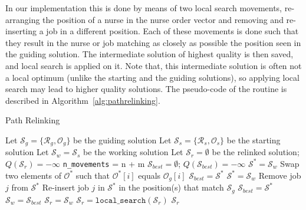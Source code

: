 \documentclass[a4paper,11pt,authoryear]{elsarticle}
\begin{document}
In our implementation this is done by means of two local search movements, re-arranging the position of a nurse in the nurse order vector and removing and re-inserting a job in a different position. Each of these movements is done such that they result in the nurse or job matching as closely as possible the position seen in the guiding solution. The intermediate solution of highest quality is then saved, and local search is applied on it. Note that, this intermediate solution is often not a local optimum (unlike the starting and the guiding solutions), so applying local search may lead to higher quality solutions. The pseudo-code of the routine is described in Algorithm~\ref{alg:pathrelinking}.

% 
\begin{algorithm}[h]
\caption{Path Relinking}
\label{alg:pathrelinking}
\begin{algorithmic}[1]
\State Let $\mathcal{S}_g = \{\mathcal{R}_g, \mathcal{O}_g\}$ be the guiding solution
\State Let $\mathcal{S}_s = \{\mathcal{R}_s, \mathcal{O}_s\}$ be the starting solution
\State Let $\mathcal{S}_w = \mathcal{S}_s$ be the working solution
\State Let $\mathcal{S}_r = \emptyset$ be the relinked solution;  $Q(\mathcal{S}_r) = -\infty$
\State \texttt{n\_movements} = n + m
 \label{alg:prmainwhile}
		\State $\mathcal{S}_{best} = \emptyset$; $Q(\mathcal{S}_{best}) = -\infty$
			\State $\mathcal{S}^* = \mathcal{S}_w$
				\State Swap two elements of $\mathcal{O}^*$ such that $\mathcal{O}^*[i]$ equals $\mathcal{O}_g[i]$
					\State $\mathcal{S}_{best} = \mathcal{S^*}$
				\EndIf
			\EndIf
		\EndFor %
			\State $\mathcal{S}^* = \mathcal{S}_w$
			\State Remove job $j$ from $\mathcal{S^*}$
			\State Re-insert job $j$ in $\mathcal{S^*}$ in the position(s) that match $\mathcal{S}_g$ \label{alg:prforinsertion}
				\State $\mathcal{S}_{best} = \mathcal{S^*}$
			\EndIf
		\EndFor %
		\State $\mathcal{S}_w = \mathcal{S}_{best}$
			\State $\mathcal{S}_r = \mathcal{S}_w$
		\EndIf
	\EndFor
\EndWhile
\State $\mathcal{S}_r = \texttt{local\_search}(\mathcal{S}_r)$
\Return $\mathcal{S}_r$
\end{algorithmic}
\end{algorithm}
\end{document}
